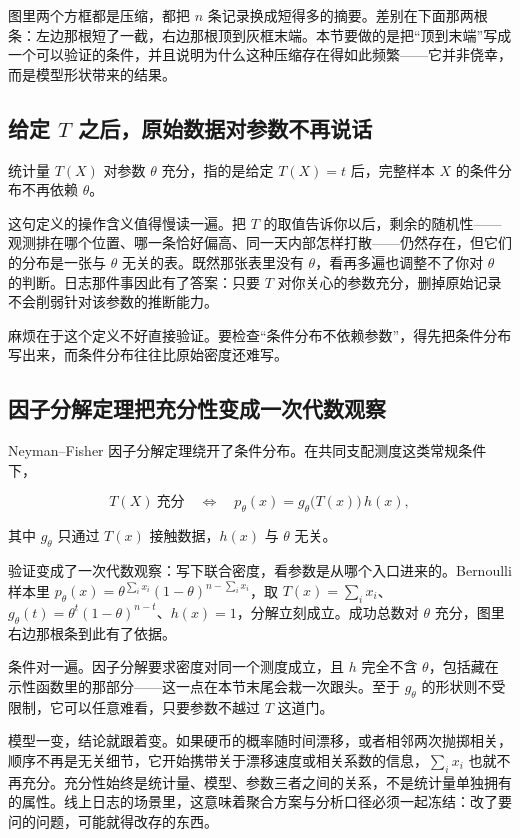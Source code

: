 图里两个方框都是压缩，都把 \(n\) 条记录换成短得多的摘要。差别在下面那两根条：左边那根短了一截，右边那根顶到灰框末端。本节要做的是把``顶到末端''写成一个可以验证的条件，并且说明为什么这种压缩存在得如此频繁——它并非侥幸，而是模型形状带来的结果。

\subsection{给定 \(T\) 之后，原始数据对参数不再说话}

统计量 \(T(X)\) 对参数 \(\theta\) 充分，指的是给定 \(T(X)=t\) 后，完整样本 \(X\) 的条件分布不再依赖 \(\theta\)。

这句定义的操作含义值得慢读一遍。把 \(T\) 的取值告诉你以后，剩余的随机性——观测排在哪个位置、哪一条恰好偏高、同一天内部怎样打散——仍然存在，但它们的分布是一张与 \(\theta\) 无关的表。既然那张表里没有 \(\theta\)，看再多遍也调整不了你对 \(\theta\) 的判断。日志那件事因此有了答案：只要 \(T\) 对你关心的参数充分，删掉原始记录不会削弱针对该参数的推断能力。

麻烦在于这个定义不好直接验证。要检查``条件分布不依赖参数''，得先把条件分布写出来，而条件分布往往比原始密度还难写。

\subsection{因子分解定理把充分性变成一次代数观察}

Neyman--Fisher 因子分解定理绕开了条件分布。在共同支配测度这类常规条件下，

\[
T(X)\ \text{充分}\quad\Longleftrightarrow\quad p_\theta(x)=g_\theta\bigl(T(x)\bigr)\,h(x),
\]

其中 \(g_\theta\) 只通过 \(T(x)\) 接触数据，\(h(x)\) 与 \(\theta\) 无关。

验证变成了一次代数观察：写下联合密度，看参数是从哪个入口进来的。Bernoulli 样本里 \(p_\theta(x)=\theta^{\sum_i x_i}(1-\theta)^{n-\sum_i x_i}\)，取 \(T(x)=\sum_i x_i\)、\(g_\theta(t)=\theta^t(1-\theta)^{n-t}\)、\(h(x)=1\)，分解立刻成立。成功总数对 \(\theta\) 充分，图里右边那根条到此有了依据。

条件对一遍。因子分解要求密度对同一个测度成立，且 \(h\) 完全不含 \(\theta\)，包括藏在示性函数里的那部分——这一点在本节末尾会栽一次跟头。至于 \(g_\theta\) 的形状则不受限制，它可以任意难看，只要参数不越过 \(T\) 这道门。

模型一变，结论就跟着变。如果硬币的概率随时间漂移，或者相邻两次抛掷相关，顺序不再是无关细节，它开始携带关于漂移速度或相关系数的信息，\(\sum_i x_i\) 也就不再充分。充分性始终是统计量、模型、参数三者之间的关系，不是统计量单独拥有的属性。线上日志的场景里，这意味着聚合方案与分析口径必须一起冻结：改了要问的问题，可能就得改存的东西。


